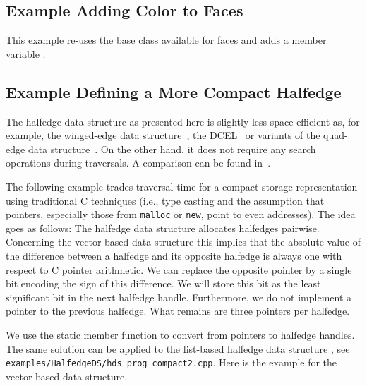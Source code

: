 

\subsection{Example Adding Color to Faces}

This example re-uses the base class available for faces and adds a
member variable .


\subsection{Example Defining a More Compact Halfedge}

\begin{ccAdvanced}
  
The halfedge data structure as presented here is slightly less space
efficient as, for example, the winged-edge data
structure~\cite{b-prcv-75}, the DCEL~\cite{mp-fitcp-78} or variants of
the quad-edge data structure~\cite{gs-pmgsc-85}.  On the other hand,
it does not require any search operations during traversals. A
comparison can be found in~\cite{k-ugpdd-99}.

The following example trades traversal time for a compact storage
representation using traditional C techniques (i.e., type casting and
the assumption that pointers, especially those from {\tt malloc} or
{\tt new}, point to even addresses). The idea goes as follows: The
halfedge data structure allocates halfedges pairwise.  Concerning the
vector-based data structure this implies that the absolute value of
the difference between a halfedge and its opposite halfedge is always
one with respect to C pointer arithmetic. We can replace the opposite
pointer by a single bit encoding the sign of this difference.  We will
store this bit as the least significant bit in the next halfedge
handle.  Furthermore, we do not implement a pointer to the previous
halfedge. What remains are three pointers per halfedge. 

We use the static member function  to convert
from pointers to halfedge handles. The same solution can be applied to
the list-based halfedge data structure ,
see \texttt{examples/HalfedgeDS/hds\_prog\_compact2.cpp}. Here is the
example for the vector-based data structure.


\end{ccAdvanced}

